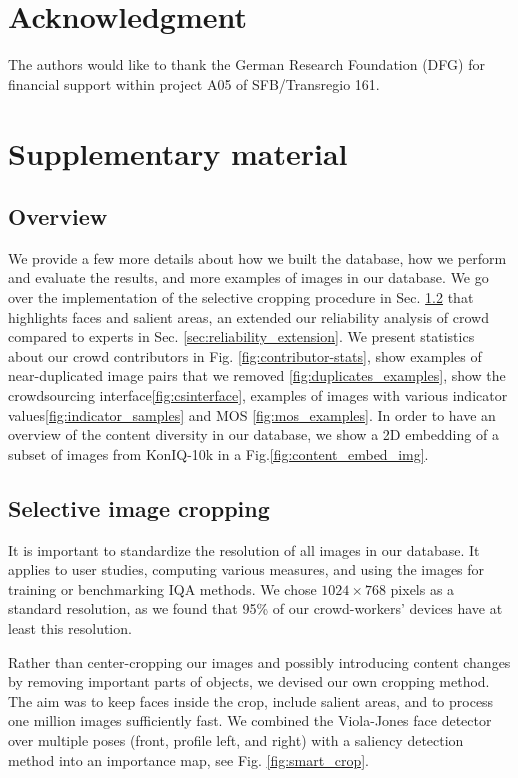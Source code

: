 \documentclass{article}
\begin{document}
\section*{Acknowledgment}
The authors would like to thank the German Research Foundation (DFG) for financial support within project A05 of SFB/Transregio 161. 




\appendix 
\newif\ifsupplementary

\ifsupplementary

\section{Supplementary material}
\subsection{Overview}

We provide a few more details about how we built the database, how we perform and evaluate the results, and more examples of images in our database. We go over the implementation of the selective cropping procedure in Sec. \ref{sec:selective_cropping} that highlights faces and salient areas, an extended our reliability analysis of crowd compared to experts in Sec. \ref{sec:reliability_extension}. We present statistics about our crowd contributors in Fig. \ref{fig:contributor-stats}, show examples of near-duplicated image pairs that we removed \ref{fig:duplicates_examples}, show the crowdsourcing interface\ref{fig:csinterface}, examples of images with various indicator values\ref{fig:indicator_samples} and MOS \ref{fig:mos_examples}.  In order to have an overview of the content diversity in our database, we show a 2D embedding of a subset of images from KonIQ-10k in a Fig.\ref{fig:content_embed_img}.

\subsection{Selective image cropping}
\label{sec:selective_cropping}
It is important to standardize the resolution of all images in our database. It applies to user studies, computing various measures, and using the images for training or benchmarking IQA methods. We chose $1024\times768$ pixels as a standard resolution, as we found that 95\% of our crowd-workers' devices have at least this resolution. 



Rather than center-cropping our images and possibly introducing content changes by removing important parts of objects, we devised our own cropping method. The aim was to keep faces inside the crop, include salient areas, and to process one million images sufficiently fast. We combined the Viola-Jones face detector over multiple poses (front, profile left, and right) with a saliency detection method \cite{hou_image_2012} into an importance map, see Fig. \ref{fig:smart_crop}.
\end{document}
